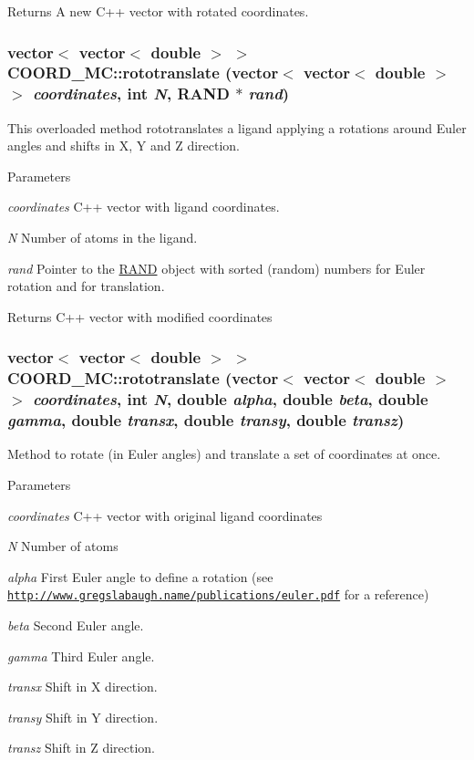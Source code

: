 \begin{DoxyReturn}{Returns}
A new C++ vector with rotated coordinates. 
\end{DoxyReturn}
\hypertarget{classCOORD__MC_a08009030898b97b0ab3ca85fc79f663e}{
\subsubsection[{rototranslate}]{\setlength{\rightskip}{0pt plus 5cm}vector$<$ vector$<$ double $>$ $>$ COORD\_\-MC::rototranslate (vector$<$ vector$<$ double $>$ $>$ {\em coordinates}, \/  int {\em N}, \/  {\bf RAND} $\ast$ {\em rand})}}
\label{classCOORD__MC_a08009030898b97b0ab3ca85fc79f663e}
This overloaded method rototranslates a ligand applying a rotations around Euler angles and shifts in X, Y and Z direction. 
\begin{DoxyParams}{Parameters}
\item[{\em coordinates}]C++ vector with ligand coordinates. \item[{\em N}]Number of atoms in the ligand. \item[{\em rand}]Pointer to the \hyperlink{classRAND}{RAND} object with sorted (random) numbers for Euler rotation and for translation. \end{DoxyParams}
\begin{DoxyReturn}{Returns}
C++ vector with modified coordinates 
\end{DoxyReturn}
\hypertarget{classCOORD__MC_ad5f14a1e75608fa9309c76337e5b38a7}{
\subsubsection[{rototranslate}]{\setlength{\rightskip}{0pt plus 5cm}vector$<$ vector$<$ double $>$ $>$ COORD\_\-MC::rototranslate (vector$<$ vector$<$ double $>$ $>$ {\em coordinates}, \/  int {\em N}, \/  double {\em alpha}, \/  double {\em beta}, \/  double {\em gamma}, \/  double {\em transx}, \/  double {\em transy}, \/  double {\em transz})}}
\label{classCOORD__MC_ad5f14a1e75608fa9309c76337e5b38a7}
Method to rotate (in Euler angles) and translate a set of coordinates at once. 
\begin{DoxyParams}{Parameters}
\item[{\em coordinates}]C++ vector with original ligand coordinates \item[{\em N}]Number of atoms \item[{\em alpha}]First Euler angle to define a rotation (see \href{http://www.gregslabaugh.name/publications/euler.pdf}{\tt http://www.gregslabaugh.name/publications/euler.pdf} for a reference) \item[{\em beta}]Second Euler angle. \item[{\em gamma}]Third Euler angle. \item[{\em transx}]Shift in X direction. \item[{\em transy}]Shift in Y direction. \item[{\em transz}]Shift in Z direction. \end{DoxyParams}
